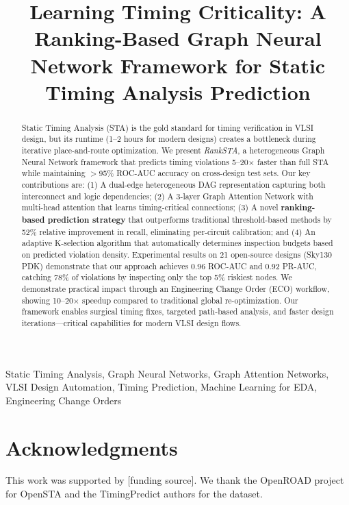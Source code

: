 \documentclass[10pt,twocolumn,journal]{IEEEtran}
\begin{document}
\title{Learning Timing Criticality: A Ranking-Based Graph Neural Network Framework for Static Timing Analysis Prediction}

\author{
}

\maketitle

\begin{abstract}
Static Timing Analysis (STA) is the gold standard for timing verification in VLSI design, but its runtime (1--2 hours for modern designs) creates a bottleneck during iterative place-and-route optimization. We present \textit{RankSTA}, a heterogeneous Graph Neural Network framework that predicts timing violations 5--20$\times$ faster than full STA while maintaining $>$95\% ROC-AUC accuracy on cross-design test sets. Our key contributions are: (1) A dual-edge heterogeneous DAG representation capturing both interconnect and logic dependencies; (2) A 3-layer Graph Attention Network with multi-head attention that learns timing-critical connections; (3) A novel \textbf{ranking-based prediction strategy} that outperforms traditional threshold-based methods by 52\% relative improvement in recall, eliminating per-circuit calibration; and (4) An adaptive K-selection algorithm that automatically determines inspection budgets based on predicted violation density. Experimental results on 21 open-source designs (Sky130 PDK) demonstrate that our approach achieves 0.96 ROC-AUC and 0.92 PR-AUC, catching 78\% of violations by inspecting only the top 5\% riskiest nodes. We demonstrate practical impact through an Engineering Change Order (ECO) workflow, showing 10--20$\times$ speedup compared to traditional global re-optimization. Our framework enables surgical timing fixes, targeted path-based analysis, and faster design iterations---critical capabilities for modern VLSI design flows.
\end{abstract}

\begin{IEEEkeywords}
Static Timing Analysis, Graph Neural Networks, Graph Attention Networks, VLSI Design Automation, Timing Prediction, Machine Learning for EDA, Engineering Change Orders
\end{IEEEkeywords}










\section*{Acknowledgments}
This work was supported by [funding source]. We thank the OpenROAD project for OpenSTA and the TimingPredict authors for the dataset.



\end{document}
